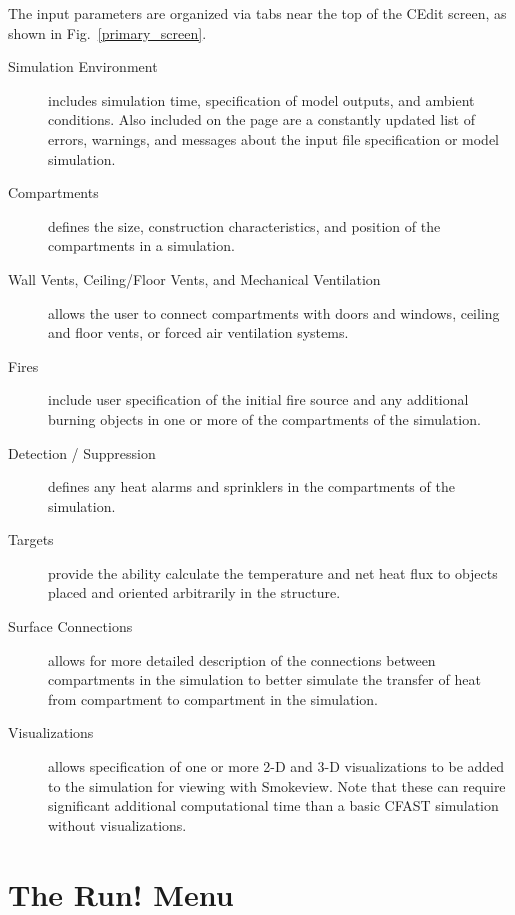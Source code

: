 The input parameters are organized via tabs near the top of the CEdit screen, as shown in Fig.~\ref{primary_screen}.
\begin{description}
\item[Simulation Environment] includes simulation time, specification of model outputs, and ambient conditions. Also included on the page are a constantly updated list of errors, warnings, and messages about the input file specification or model simulation.
\item[Compartments] defines the size, construction characteristics, and position of the compartments in a simulation.
\item[Wall Vents, Ceiling/Floor Vents, and Mechanical Ventilation] allows the user to connect compartments with doors and windows, ceiling and floor vents, or forced air ventilation systems.
\item[Fires] include user specification of the initial fire source and any additional burning objects in one or more of the compartments of the simulation.
\item[Detection / Suppression] defines any heat alarms and sprinklers in the compartments of the simulation.
\item[Targets] provide the ability calculate the temperature and net heat flux to objects placed and oriented arbitrarily in the structure.
\item[Surface Connections] allows for more detailed description of the connections between compartments in the simulation to better simulate the transfer of heat from compartment to compartment in the simulation.
\item[Visualizations] allows specification of one or more 2-D and 3-D visualizations to be added to the simulation for viewing with Smokeview. Note that these can require significant additional computational time than a basic CFAST simulation without visualizations.
\end{description}


\section{The Run! Menu}


